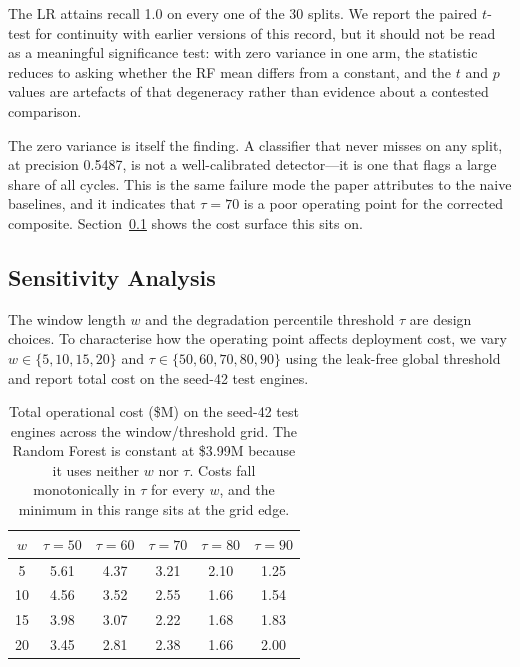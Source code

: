 \documentclass[10pt,twocolumn]{article}
\begin{document}
The LR attains recall 1.0 on every one of the 30 splits. We report the paired $t$-test
for continuity with earlier versions of this record, but it should not be read as a
meaningful significance test: with zero variance in one arm, the statistic reduces to
asking whether the RF mean differs from a constant, and the $t$ and $p$ values are
artefacts of that degeneracy rather than evidence about a contested comparison.

The zero variance is itself the finding. A classifier that never misses on any split,
at precision 0.5487, is not a well-calibrated detector---it is one that flags a large
share of all cycles. This is the same failure mode the paper attributes to the naive
baselines, and it indicates that $\tau=70$ is a poor operating point for the corrected
composite. Section~\ref{sec:sensitivity} shows the cost surface this sits on.

\subsection{Sensitivity Analysis}
\label{sec:sensitivity}

The window length $w$ and the degradation percentile threshold $\tau$ are design
choices.
To characterise how the operating point affects deployment cost, we vary
$w \in \{5,10,15,20\}$ and $\tau \in \{50,60,70,80,90\}$ using the leak-free global
threshold and report total cost on the seed-42 test engines.

\begin{table}[h]
\centering
\caption{Total operational cost (\$M) on the seed-42 test engines across the
window/threshold grid. The Random Forest is constant at \$3.99M because it uses neither
$w$ nor $\tau$. Costs fall monotonically in $\tau$ for every $w$, and the minimum in
this range sits at the grid edge.}
\label{tab:costgrid}
\vspace{4pt}
\small
\begin{tabular}{cccccc}
\toprule
$w$ & $\tau=50$ & $\tau=60$ & $\tau=70$ & $\tau=80$ & $\tau=90$ \\
\midrule
 5 & 5.61 & 4.37 & 3.21 & 2.10 & 1.25 \\
10 & 4.56 & 3.52 & 2.55 & 1.66 & 1.54 \\
15 & 3.98 & 3.07 & 2.22 & 1.68 & 1.83 \\
20 & 3.45 & 2.81 & 2.38 & 1.66 & 2.00 \\
\bottomrule
\end{tabular}
\end{table}
\end{document}

